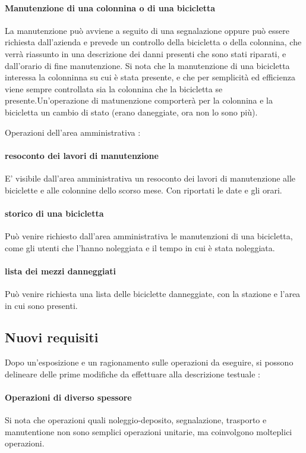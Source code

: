 \documentclass[a4paper,twoside]{article}
\begin{document}
\paragraph{Manutenzione di una colonnina o di una bicicletta} La manutenzione può avviene a seguito di una segnalazione oppure può essere richiesta dall'azienda e prevede un controllo della bicicletta o della colonnina, che verrà riassunto in una descrizione dei danni presenti che sono stati riparati, e dall'orario di fine manutenzione. Si nota che la manutenzione di una bicicletta interessa la colonninna su cui è stata presente, e che per semplicità ed efficienza viene sempre controllata sia la colonnina che la bicicletta se presente.Un'operazione di matunenzione comporterà per la colonnina e la bicicletta un cambio di stato (erano daneggiate, ora non lo sono più).
\par Operazioni dell'area amministrativa :
\paragraph{resoconto dei lavori di manutenzione} E' visibile dall'area amministrativa un resoconto dei lavori di manutenzione alle biciclette e alle colonnine dello scorso mese. Con riportati le date e gli orari.
\paragraph{storico di una bicicletta} Può venire richiesto dall'area amministrativa le manutenzioni di una bicicletta, come gli utenti che l'hanno noleggiata e il tempo in cui è stata noleggiata.
\paragraph{lista dei mezzi danneggiati} Può venire richiesta una lista delle biciclette danneggiate, con la stazione e l'area in cui sono presenti.

\subsection{Nuovi requisiti}
Dopo un'esposizione e un ragionamento sulle operazioni da eseguire, si possono delineare delle prime modifiche da effettuare alla descrizione testuale :
\paragraph{Operazioni di diverso spessore} Si nota che operazioni quali noleggio-deposito, segnalazione, trasporto e manutentione non sono semplici operazioni unitarie, ma coinvolgono molteplici operazioni.
\end{document}
